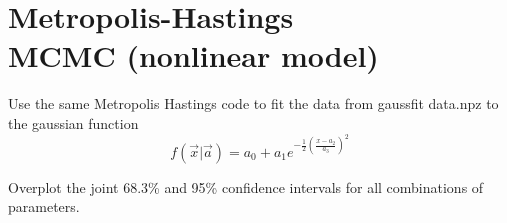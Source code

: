 \section{Metropolis-Hastings \\MCMC (nonlinear model)}

Use the same Metropolis Hastings code to fit the data from gaussfit data.npz to the gaussian function
\begin{equation}
    f(\Vec{x}|\Vec{a})=a_0+a_1e^{-\frac{1}{2}(\frac{x-a_2}{a_3})^2}
\end{equation}

Overplot the joint 68.3\% and 95\% confidence intervals for all combinations of parameters.